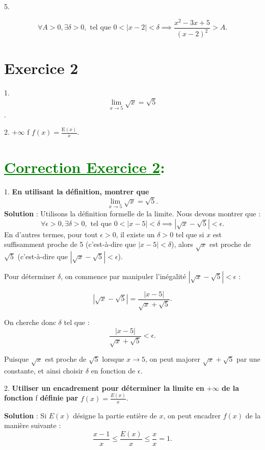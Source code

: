 \documentclass[12pt]{article}
\begin{document}
5. 

\[
\forall A > 0, \exists \delta > 0, \text{ tel que } 0 < |x - 2| < \delta \implies \frac{x^{2}-3x+5}{(x-2)^{2}} > A.
\]

\section*{Exercice 2}

1.  
\[\lim_{x \to 5} \sqrt{x} = \sqrt{5}\].

2.  $+\infty$  f  $f(x) = \frac{\mathrm{E}(x)}{x}$.

\section*{\textcolor{green}{\underline{Correction Exercice 2}:}}

1. \textbf{En utilisant la définition, montrer que}
\[
\lim_{x \to 5} \sqrt{x} = \sqrt{5}.
\]
\textbf{Solution} : Utilisons la définition formelle de la limite. Nous devons montrer que :
\[
\forall \epsilon > 0, \exists \delta > 0, \text{ tel que } 0 < |x - 5| < \delta \implies |\sqrt{x} - \sqrt{5}| < \epsilon.
\]
En d'autres termes, pour tout \( \epsilon > 0 \), il existe un \( \delta > 0 \) tel que si \( x \) est suffisamment proche de 5 (c'est-à-dire que \( |x - 5| < \delta \)), alors \( \sqrt{x} \) est proche de \( \sqrt{5} \) (c'est-à-dire que \( |\sqrt{x} - \sqrt{5}| < \epsilon \)).

Pour déterminer \( \delta \), on commence par manipuler l'inégalité \( |\sqrt{x} - \sqrt{5}| < \epsilon \) :

\[
|\sqrt{x} - \sqrt{5}| = \frac{|x - 5|}{\sqrt{x} + \sqrt{5}}.
\]

On cherche donc \( \delta \) tel que :
\[
\frac{|x - 5|}{\sqrt{x} + \sqrt{5}} < \epsilon.
\]

Puisque \( \sqrt{x} \) est proche de \( \sqrt{5} \) lorsque \( x \to 5 \), on peut majorer \( \sqrt{x} + \sqrt{5} \) par une constante, et ainsi choisir \( \delta \) en fonction de \( \epsilon \).

2. \textbf{Utiliser un encadrement pour déterminer la limite en } $+\infty$ \textbf{ de la fonction } f \textbf{ définie par } $f(x) = \frac{E(x)}{x}$.

\textbf{Solution} : Si \( E(x) \) désigne la partie entière de \( x \), on peut encadrer \( f(x) \) de la manière suivante :
\[
\frac{x-1}{x} \leq \frac{E(x)}{x} \leq \frac{x}{x} = 1.
\]
\end{document}
